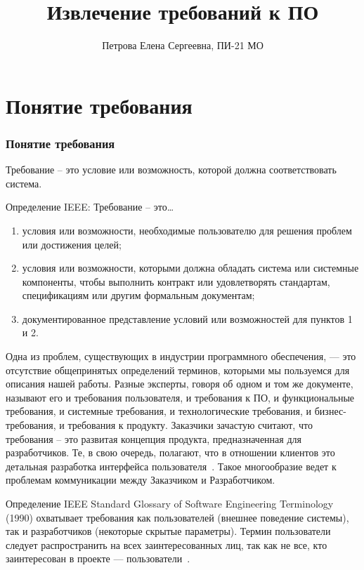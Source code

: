 \documentclass{../industrial-development}
\title{Извлечение требований к ПО}
\author{Петрова Елена Сергеевна, ПИ-21 МО}
\date{}
\begin{document}
\begin{frame}
  \titlepage
\end{frame}
\section{Понятие требования}
\begin{frame} \frametitle{Понятие требования}
  \begin{block}{}
   \alert{Требование} – это условие или
возможность, которой должна
соответствовать система.
  \end{block}
  Определение IEEE:  \alert{Требование} – это\dots
	 \begin{enumerate}
\item условия или возможности, необходимые
пользователю для решения проблем или
достижения целей;
\item условия или возможности, которыми должна
обладать система или системные
компоненты, чтобы выполнить контракт или
удовлетворять стандартам, спецификациям
или другим формальным документам;
\item документированное представление условий
или возможностей для пунктов 1 и 2.
  \end{enumerate}
\end{frame}

\lecturenotes

Одна из проблем, существующих в индустрии программного обеспечения, — это отсутствие общепринятых определений терминов, которыми мы пользуемся для описания нашей работы. Разные эксперты, говоря об одном и том же документе, называют его и требования пользователя, и требования к ПО, и функциональные требования, и системные требования, и технологические требования, и бизнес-требования, и требования к продукту. Заказчики зачастую считают, что требования -- это развитая концепция продукта, предназначенная для
разработчиков. Те, в свою очередь, полагают, что в отношении клиентов это детальная разработка интерфейса пользователя~\cite[с.~6]{Wiegers}. Такое многообразие ведет к проблемам коммуникации между Заказчиком и Разработчиком.

Определение IEEE Standard Glossary
of Software Engineering Terminology (1990) охватывает требования как пользователей (внешнее поведение системы), так и разработчиков (некоторые скрытые параметры). Термин пользователи следует распространить на всех заинтересованных лиц, так как не все, кто заинтересован в проекте — пользователи~\cite[с.~7]{Wiegers}. 
\end{document}
